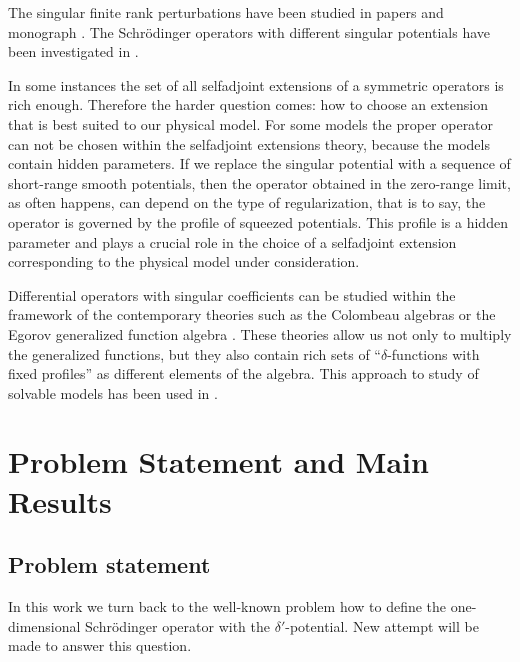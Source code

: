 \documentclass[11pt,english]{amsart}
\begin{document}
The singular finite rank perturbations have been studied in papers \cite{AlbeverioKoshmanenko1999, KuzhelNizhnik,
KoshmanenkoUMZh1991, Nizhnik2001} and monograph \cite{KoshmanenkoBook}. The Schr\"{o}dinger operators with different singular potentials have been investigated in \cite{HrynivMykytiuk2001, MikhailetsMolyboga, NizhFAA2003,
ShkalikovSavchMatNotes2006, ShkalikovSavchukMatNotes1999,
ShkalikovSavchukTMMO2003}.

In some instances the set of all selfadjoint extensions of a symmetric operators is rich enough.
Therefore the harder question comes: how to choose an extension that is best suited to our physical model.
For some models the proper operator can not be chosen within the selfadjoint extensions theory, because
the models contain hidden parameters. If we replace the singular potential with a sequence of short-range smooth potentials, then the operator obtained in the zero-range limit, as often happens, can depend on the type of regularization, that is to say, the operator is governed by the profile of squeezed potentials. This profile is a hidden parameter and plays a crucial role in the choice of a selfadjoint extension corresponding to the physical model under consideration.

Differential operators with singular coefficients can be studied within the framework of the contemporary theories such as
the Colombeau algebras \cite{Colombeau} or the  Egorov  generalized  function algebra \cite{Egorov}.
These theories allow us not only to multiply the generalized functions, but they also contain  rich sets of
``$\delta$-functions with  fixed profiles''  as  different elements of the algebra.
This approach to study of  solvable models has been used in \cite{Antonevich1, Antonevich2}.

\section{Problem Statement and Main Results}
\subsection{Problem statement}

In this work we turn back to the well-known problem how to define the one-dimensional Schr\"{o}dinger operator with the $\delta'$-potential. New attempt will be made to answer this question.
\end{document}

